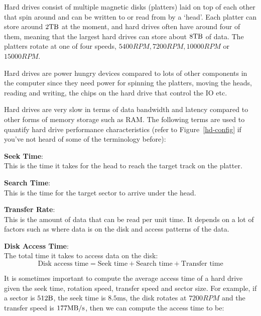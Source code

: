 Hard drives consist of multiple magnetic disks (platters) laid on top of each
other that spin around and can be written to or read from by a `head'. Each
platter can store around $2\si{\tera\byte}$ at the moment, and hard drives often
have around four of them, meaning that the largest hard drives can store about
$8\si{\tera\byte}$ of data. The platters rotate at one of four speeds, $5400RPM,
7200RPM, 10000RPM$ or $15000RPM$.

Hard drives are power hungry devices compared to lots of other components in the
computer since they need power for spinning the platters, moving the heads,
reading and writing, the chips on the hard drive that control the IO etc.

Hard drives are very slow in terms of data bandwidth and latency compared to
other forms of memory storage such as RAM. The following terms are used to
quantify hard drive performance characteristics (refer to Figure~\ref{hd-config}
if you've not heard of some of the terminology before):

\begin{description}
  \item \textbf{Seek Time}:\\
    This is the time it takes for the head to reach the target track on the
    platter.
  \item \textbf{Search Time}:\\
    This is the time for the target sector to arrive under the head.
  \item \textbf{Transfer Rate}:\\
    This is the amount of data that can be read per unit time. It depends on
    a lot of factors such as where data is on the disk and access patterns of
    the data.
  \item \textbf{Disk Access Time}:\\
    The total time it takes to access data on the disk:
    \[
     \text{Disk access time} = \text{Seek time} + \text{Search time}
                                + \text{Transfer time}
    \]
\end{description}

It is sometimes important to compute the average access time of a hard drive
given the seek time, rotation speed, transfer speed and sector size. For
example, if a sector is $512\si{\byte}$, the seek time is
$8.5\si{\milli\second}$, the disk rotates at $7200RPM$ and the transfer speed is
$177\si{\mega\byte\per\second}$, then we can compute the access time to be:

